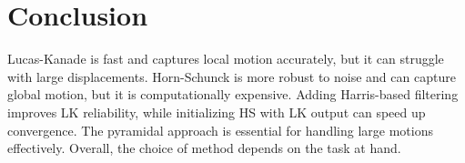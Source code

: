 \documentclass[9pt]{IEEEtran}
\begin{document}
\section{Conclusion}

Lucas-Kanade is fast and captures local motion accurately, but it can struggle with large displacements. Horn-Schunck
is more robust to noise and can capture global motion, but it is computationally expensive. Adding Harris-based filtering
improves LK reliability, while initializing HS with LK output can speed up convergence. The pyramidal approach is
essential for handling large motions effectively. Overall, the choice of method depends on the task at hand. 



\end{document}
